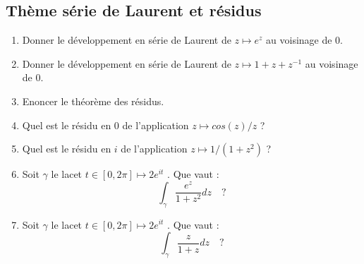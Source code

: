 \documentclass[a4paper, 12pt]{amsart}
\begin{document}
\subsection{Thème série de Laurent et résidus}
\begin{enumerate}
	\item Donner le développement en série de Laurent de $z \mapsto e^z$ au voisinage de 0.
	\item Donner le développement en série de Laurent de $z \mapsto 1+z+z^{-1}$ au voisinage de 0.
	\item Enoncer le théorème des résidus.
	\item Quel est le résidu en 0 de l'application $z \mapsto cos(z)/z$ ?
	\item Quel est le résidu en $i$ de l'application $z \mapsto 1/(1 + z^2 )$ ?
	\item Soit $\gamma$ le lacet $t \in [0, 2\pi] \mapsto 2e^{it}$ . Que vaut :
\[
\int_{\gamma} \frac{e^z}{1+z^2}dz\quad ?
\]
	\item Soit $\gamma$ le lacet $t \in [0, 2\pi] \mapsto 2e^{it}$ . Que vaut :
	\[
	\int_{\gamma} \frac{z}{1+z}dz\quad ?
	\]
\end{enumerate}
\end{document}
